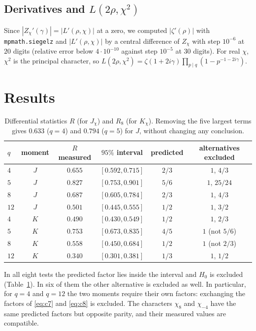 \documentclass[11pt]{amsart}
\newcommand{\Lp}{L'}
\begin{document}
\subsection{Derivatives and $L(2\rho,\chi^{2})$}
Since $|Z_\chi'(\gamma)|=|\Lp(\rho,\chi)|$ at a zero, we computed $|\zeta'(\rho)|$ with \texttt{mpmath.siegelz} and
$|\Lp(\rho,\chi)|$ by a central difference of $Z_\chi$ with step $10^{-6}$ at $20$ digits (relative error below
$4\cdot10^{-10}$ against step $10^{-5}$ at $30$ digits). For real $\chi$, $\chi^{2}$ is the principal character, so
$L(2\rho,\chi^{2})=\zeta(1+2i\gamma)\prod_{p\mid q}(1-p^{-1-2i\gamma})$.

\section{Results}\label{sec:results}

\begin{table}[h]
\centering
\begin{tabular}{lccccc}
\toprule
$q$ & moment & $R$ measured & $95\%$ interval & predicted & alternatives excluded\\
\midrule
$4$  & $J$ & $0.655$ & $[0.592,0.715]$ & $2/3$ & $1$, $4/3$\\
$5$  & $J$ & $0.827$ & $[0.753,0.901]$ & $5/6$ & $1$, $25/24$\\
$8$  & $J$ & $0.687$ & $[0.605,0.784]$ & $2/3$ & $1$, $4/3$\\
$12$ & $J$ & $0.501$ & $[0.445,0.555]$ & $1/2$ & $1$, $3/2$\\
\midrule
$4$  & $K$ & $0.490$ & $[0.430,0.549]$ & $1/2$ & $1$, $2/3$\\
$5$  & $K$ & $0.753$ & $[0.673,0.835]$ & $4/5$ & $1$ (not $5/6$)\\
$8$  & $K$ & $0.558$ & $[0.450,0.684]$ & $1/2$ & $1$ (not $2/3$)\\
$12$ & $K$ & $0.340$ & $[0.301,0.381]$ & $1/3$ & $1$, $1/2$\\
\bottomrule
\end{tabular}
\caption{Differential statistics $R$ (for $J_\chi$) and $R_8$ (for $K_\chi$). Removing the five largest terms gives
$0.633$ ($q=4$) and $0.794$ ($q=5$) for $J$, without changing any conclusion.}
\label{tab:results}
\end{table}

In all eight tests the predicted factor lies inside the interval and $H_0$ is excluded (Table~\ref{tab:results}). In
six of them the other alternative is excluded as well. In particular, for $q=4$ and $q=12$ the two moments require
their own factors: exchanging the factors of \eqref{eq:c7} and \eqref{eq:c8} is excluded. The characters $\chi_8$ and
$\chi_{-4}$ have the same predicted factors but opposite parity, and their measured values are compatible.
\end{document}
